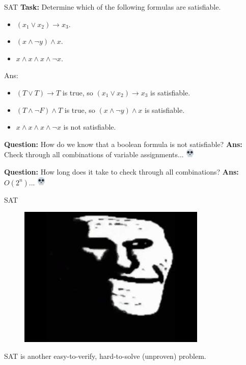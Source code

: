 \documentclass{beamer}
\newcommand{\emojiskull}{\includegraphics[width=12pt]{img/skull.png}}
\begin{document}
\begin{frame}{SAT}
\textbf{Task:} Determine which of the following formulas are satisfiable.

\begin{itemize}
    \item $(x_1 \lor x_2) \rightarrow x_3$.
    \item $(x \land \neg y) \land x$.
    \item $x \land x \land x \land \neg x$.
\end{itemize}

Ans:
\begin{itemize}
    \item $(T \lor T) \rightarrow T$ is true, so $(x_1 \lor x_2) \rightarrow x_3$ is satisfiable.
    \item $(T \land \neg F) \land T$ is true, so $(x \land \neg y) \land x$ is satisfiable.
    \item $x \land x \land x \land \neg x$ is not satisfiable.
\end{itemize}
\pause
\textbf{Question:} How do we know that a boolean formula is not satisfiable?
\pause
\textbf{Ans:} Check through all combinations of variable assignments... \emojiskull

\vspace{2mm} \pause

\textbf{Question:} How long does it take to check through all combinations?
\pause
\textbf{Ans:} $O(2^n)$... \emojiskull


\end{frame}

\begin{frame}{SAT}
\begin{figure}[h]
    \centering
    \includegraphics[width=0.8\textwidth]{img/trollge.jpg}
\end{figure}
\begin{center}
    SAT is another easy-to-verify, hard-to-solve (unproven) problem.
\end{center}

\end{frame}
\end{document}
